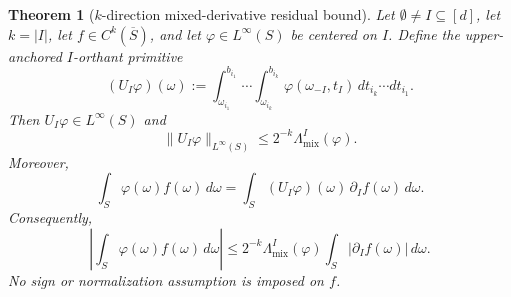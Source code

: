 \documentclass[11pt,letterpaper]{article}
\newtheorem{theorem}{Theorem}[section]
\theoremstyle{definition}
\theoremstyle{remark}
\begin{document}
\begin{theorem}[$k$-direction mixed-derivative residual bound]
\label{thm:k_direction_mixed_derivative_bound}
Let $\emptyset\neq I\subseteq[d]$, let $k=|I|$, let
$f\in C^k(\overline S)$, and let $\varphi\in L^\infty(S)$ be centered on $I$.
Define the upper-anchored $I$-orthant primitive
\begin{equation}
\label{eq:def_UI_primitive}
(U_I\varphi)(\omega)
:=
\int_{\omega_{i_1}}^{b_{i_1}}
\cdots
\int_{\omega_{i_k}}^{b_{i_k}}
\varphi(\omega_{-I},t_I)\,
dt_{i_k}\cdots dt_{i_1}.
\end{equation}
Then $U_I\varphi\in L^\infty(S)$ and
\begin{equation}
\label{eq:UI_primitive_sup_bound}
\|U_I\varphi\|_{L^\infty(S)}
\le
2^{-k}\Lambda_{\mathrm{mix}}^I(\varphi).
\end{equation}
Moreover,
\begin{equation}
\label{eq:k_direction_mixed_derivative_identity}
\int_S\varphi(\omega)f(\omega)\,d\omega
=
\int_S (U_I\varphi)(\omega)\,\partial_I f(\omega)\,d\omega .
\end{equation}
Consequently,
\begin{equation}
\label{eq:k_direction_mixed_derivative_bound}
\left|
\int_S\varphi(\omega)f(\omega)\,d\omega
\right|
\le
2^{-k}\Lambda_{\mathrm{mix}}^I(\varphi)
\int_S|\partial_I f(\omega)|\,d\omega .
\end{equation}
No sign or normalization assumption is imposed on $f$.
\end{theorem}
\end{document}
